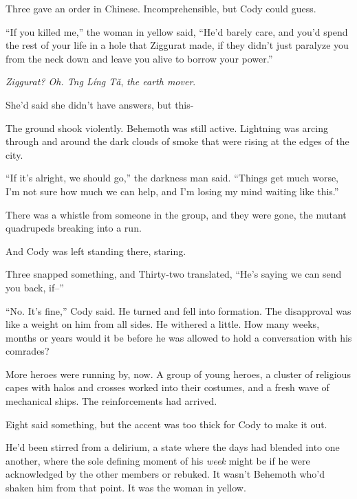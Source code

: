 Three gave an order in Chinese.  Incomprehensible, but Cody could guess.



``If you killed me,'' the woman in yellow said, ``He'd barely care, and you'd spend the rest of your life in a hole that Ziggurat made, if they didn't just paralyze you from the neck down and leave you alive to borrow your power.''



\emph{Ziggurat?  Oh.  Tng L\'{i}ng T\v{a}}, \emph{the earth mover}.



She'd said she didn't have answers, but this-



The ground shook violently.  Behemoth was still active.  Lightning was arcing through and around the dark clouds of smoke that were rising at the edges of the city.



``If it's alright, we should go,'' the darkness man said.  ``Things get much worse, I'm not sure how much we can help, and I'm losing my mind waiting like this.''



There was a whistle from someone in the group, and they were gone, the mutant quadrupeds breaking into a run.



And Cody was left standing there, staring.



Three snapped something, and Thirty-two translated, ``He's saying we can send you back, if--''



``No.  It's fine,'' Cody said.  He turned and fell into formation.  The disapproval was like a weight on him from all sides.  He withered a little.  How many weeks, months or years would it be before he was allowed to hold a conversation with his comrades?



More heroes were running by, now.  A group of young heroes, a cluster of religious capes with halos and crosses worked into their costumes, and a fresh wave of mechanical ships.  The reinforcements had arrived.



Eight said something, but the accent was too thick for Cody to make it out.



He'd been stirred from a delirium, a state where the days had blended into one another, where the sole defining moment of his \emph{week} might be if he were acknowledged by the other members or rebuked.  It wasn't Behemoth who'd shaken him from that point.  It was the woman in yellow.



